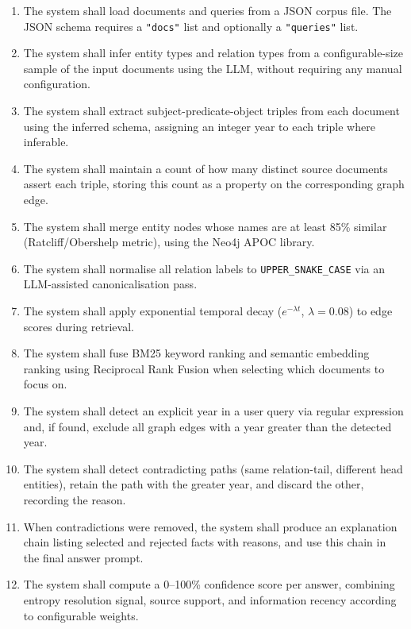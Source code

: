 \begin{enumerate}
    \item[\textbf{FR1}] The system shall load documents and queries from a JSON
    corpus file. The JSON schema requires a \texttt{"docs"} list and optionally
    a \texttt{"queries"} list.

    \item[\textbf{FR2}] The system shall infer entity types and relation types
    from a configurable-size sample of the input documents using the LLM, without
    requiring any manual configuration.

    \item[\textbf{FR3}] The system shall extract subject-predicate-object triples
    from each document using the inferred schema, assigning an integer year to
    each triple where inferable.

    \item[\textbf{FR4}] The system shall maintain a count of how many distinct
    source documents assert each triple, storing this count as a property on the
    corresponding graph edge.

    \item[\textbf{FR5}] The system shall merge entity nodes whose names are at
    least 85\% similar (Ratcliff/Obershelp metric), using the Neo4j APOC library.

    \item[\textbf{FR6}] The system shall normalise all relation labels to
    \texttt{UPPER\_SNAKE\_CASE} via an LLM-assisted canonicalisation pass.

    \item[\textbf{FR7}] The system shall apply exponential temporal decay
    ($ e^{-\lambda t} $, $\lambda=0.08$) to edge scores during retrieval.

    \item[\textbf{FR8}] The system shall fuse BM25 keyword ranking and semantic
    embedding ranking using Reciprocal Rank Fusion when selecting which documents
    to focus on.

    \item[\textbf{FR9}] The system shall detect an explicit year in a user query
    via regular expression and, if found, exclude all graph edges with a year
    greater than the detected year.

    \item[\textbf{FR10}] The system shall detect contradicting paths (same
    relation-tail, different head entities), retain the path with the greater
    year, and discard the other, recording the reason.

    \item[\textbf{FR11}] When contradictions were removed, the system shall
    produce an explanation chain listing selected and rejected facts with reasons,
    and use this chain in the final answer prompt.

    \item[\textbf{FR12}] The system shall compute a 0--100\% confidence score
    per answer, combining entropy resolution signal, source support, and
    information recency according to configurable weights.
\end{enumerate}

